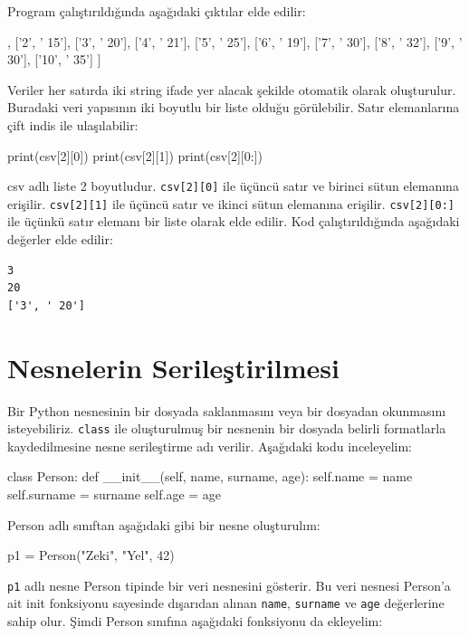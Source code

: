 \documentclass[12pt]{report}
\begin{document}
Program çalıştırıldığında aşağıdaki çıktılar elde edilir:


\begin{python}
['X', ' Y']
[
	['1', ' 10'], 
	['2', ' 15'], 
	['3', ' 20'], 
	['4', ' 21'], 
	['5', ' 25'], 
	['6', ' 19'], 
	['7', ' 30'], 
	['8', ' 32'], 
	['9', ' 30'], 
	['10', ' 35']
]
\end{python}


Veriler her satırda iki string ifade yer alacak şekilde otomatik olarak oluşturulur. Buradaki veri yapısının iki boyutlu bir liste olduğu görülebilir. Satır elemanlarına çift indis ile ulaşılabilir:


\begin{python}
print(csv[2][0])
print(csv[2][1])
print(csv[2][0:])
\end{python}

csv adlı liste 2 boyutludur. \texttt{csv[2][0]} ile üçüncü satır ve birinci sütun elemanına erişilir. \texttt{csv[2][1]} ile üçüncü satır ve ikinci sütun elemanına erişilir. \texttt{csv[2][0:]} ile üçünkü satır elemanı bir liste olarak elde edilir. Kod çalıştırıldığında aşağıdaki değerler elde edilir:

\begin{verbatim}
3
20
['3', ' 20']
\end{verbatim}


\section{Nesnelerin Serileştirilmesi}
Bir Python nesnesinin bir dosyada saklanmasını veya bir dosyadan okunmasını isteyebiliriz. \texttt{class} ile oluşturulmuş bir nesnenin bir dosyada belirli formatlarla kaydedilmesine nesne serileştirme adı verilir. Aşağıdaki kodu inceleyelim:

\begin{python}
class Person:
	def __init__(self, name, surname, age):
		self.name = name
		self.surname = surname
		self.age = age
\end{python}

Person adlı sınıftan aşağıdaki gibi bir nesne oluşturulım:

\begin{python}
p1 = Person("Zeki", "Yel", 42)
\end{python}

\texttt{p1} adlı nesne Person tipinde bir veri nesnesini gösterir. Bu veri nesnesi Person'a ait init fonksiyonu sayesinde dışarıdan alınan \texttt{name}, \texttt{surname} ve \texttt{age} değerlerine sahip olur. Şimdi Person sınıfına aşağıdaki fonksiyonu da ekleyelim:
\end{document}

